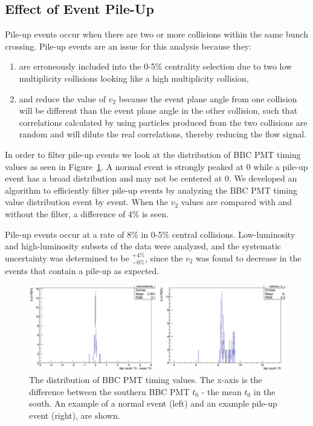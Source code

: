 \subsection{Effect of Event Pile-Up}
Pile-up events occur when there are two or more collisions within the same bunch crossing. Pile-up events are an issue for this analysis because they:
\begin{enumerate}
\item are erroneously included into the 0-5\% centrality selection due to two low multiplicity collisions looking like a high multiplicity collision,
\item and reduce the value of $v_2$ because the event plane angle from one collision will be different than the event plane angle in the other collision, such that correlations calculated by using particles produced from the two collisions are random and will dilute the real correlations, thereby reducing the flow signal.
\end{enumerate}

In order to filter pile-up events we look at the distribution of BBC PMT timing values as seen in Figure~\ref{fig:pile_up_example}. A normal event is strongly peaked at 0 while a pile-up event has a broad distribution and may not be centered at 0. We developed an algorithm to efficiently filter pile-up events by analyzing the BBC PMT timing value distribution event by event. When the $v_2$ values are compared with and without the filter, a difference of 4\% is seen. 

Pile-up events occur at a rate of 8\% in 0-5\% central \pau collisions. Low-luminosity and high-luminosity subsets of the data were analyzed, and the systematic uncertainty was determined to be $^{+4\%}_{-0\%}$, since the $v_2$  was found to decrease in the events that contain a pile-up as expected.

\begin{figure}[!h]
\begin{center}
\includegraphics[width=0.8\linewidth]{figs/example_pile_up_event.png}
\caption{The distribution of BBC PMT timing values. The x-axis is the difference between the southern BBC PMT $t_0$ - the mean $t_0$ in the south. An example of a normal event (left) and an example pile-up event (right), are shown.}
\label{fig:pile_up_example}
\end{center}
\end{figure}

